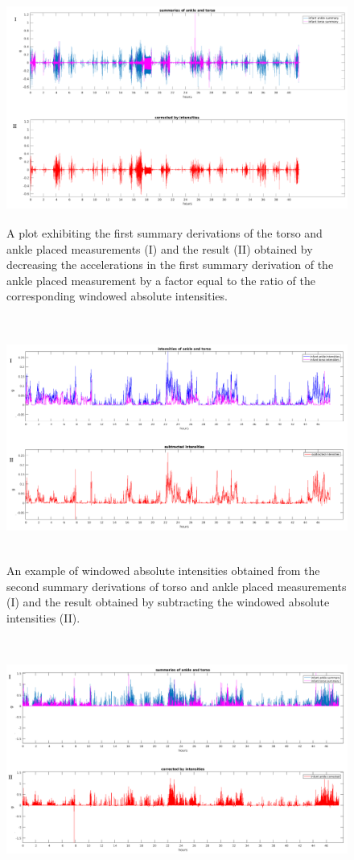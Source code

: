 \documentclass{article}
\begin{document}
{\begin{figure}[h!]
\includegraphics[width=15cm, height=7.5cm]{correctingIntensities.png}
\caption{A plot exhibiting the first summary derivations of the torso and ankle placed measurements (I) and the result (II) obtained by decreasing the accelerations in the first summary derivation of the ankle placed measurement by a factor equal to the ratio of the corresponding windowed absolute intensities.}
\end{figure}
\newpage
\begin{figure}[h!]
\includegraphics[width=15cm, height=8cm]{bandpass_summary_example_B.png}
\caption{An example of windowed absolute intensities obtained from the second summary derivations of torso and ankle placed measurements (I) and the result obtained by subtracting the windowed absolute intensities (II).}
\end{figure}
\begin{figure}[h!]
\includegraphics[width=15cm, height=8cm]{bandpass_summary_example_C.png}

\end{figure}}
\end{document}

